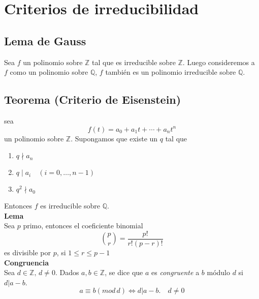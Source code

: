 \documentclass{article}
\newcommand{\Z}{\mathbb Z}
\newcommand{\Q}{\mathbb Q}
\begin{document}
	\section{Criterios de irreducibilidad}
	\subsection{Lema de Gauss}
	Sea $f$ un polinomio sobre $\mathbb{Z}$ tal que es irreducible sobre $\mathbb{Z}$. Luego consideremos a $f$ como un polinomio sobre $\mathbb{Q}$, $f$ también es un polinomio irreducible sobre $\mathbb{Q}$.
	\subsection{Teorema  (Criterio de Eisenstein)}
	\noindent sea 
	\[
	f(t) = a_0 + a_1 t + \cdots + a_n t^n
	\]
	un polinomio sobre $\Z$. Supongamos que existe un $q$ tal que
	\begin{enumerate}
		\item $q \nmid a_n$
		\item $q \mid a_i \quad (i = 0, \ldots, n-1)$
		\item $q^2 \nmid a_0$
	\end{enumerate}
	Entonces $f$ es irreducible sobre $\Q$.\\
	\textbf{\large Lema}\\
	Sea $p$ primo, entonces el coeficiente binomial \[\binom{p}{r}=\frac{p!}{r!(p-r)!}\] es divisible por $p$, si $1\leq r\leq p-1$\\
	\textbf{\large Congruencia}\\
	Sea $d\in\mathbb Z,\,d\neq 0$. Dados $a,b\in\mathbb Z$, se dice que $a$ es \textit{congruente} a $b$ módulo $d$ si $d|a-b$.
	\[a\equiv b(mod\, d)\Longleftrightarrow d|a-b.\quad d\neq 0\]
\end{document}
